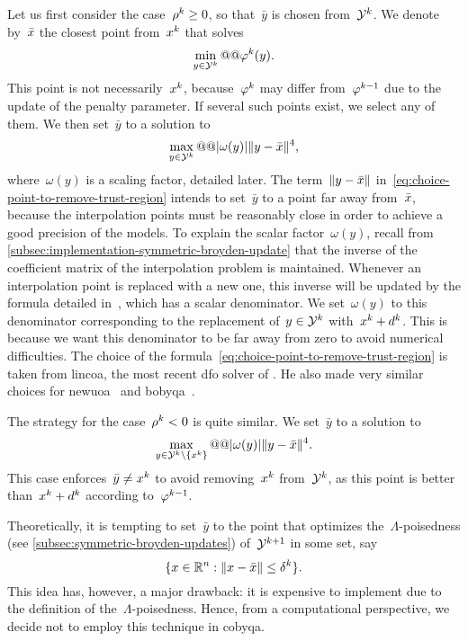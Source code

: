 Let us first consider the case~$\ratio[k] \ge 0$, so that~$\bar{y}$ is chosen from~$\xpt[k]$.
We denote by~$\bar{\iter}$ the closest point from~$\iter[k]$ that solves
\begin{equation*}
    \min_{y \in \xpt[k]} @@ \merit[k](y).
\end{equation*}
This point is not necessarily~$\iter[k]$, because~$\merit[k]$ may differ from~$\merit[k - 1]$ due to the update of the penalty parameter.
If several such points exist, we select any of them.
We then set~$\bar{y}$ to a solution to
\begin{equation}
    \label{eq:choice-point-to-remove-trust-region}
    \max_{y \in \xpt[k]} @@ \abs{\omega(y)} \norm{y - \bar{\iter}}^4,
\end{equation}
where~$\omega(y)$ is a scaling factor, detailed later.
The term~$\norm{y - \bar{\iter}}$ in~\cref{eq:choice-point-to-remove-trust-region} intends to set~$\bar{y}$ to a point far away from~$\bar{\iter}$, because the interpolation points must be reasonably close in order to achieve a good precision of the models.
To explain the scalar factor~$\omega(y)$, recall from \cref{subsec:implementation-symmetric-broyden-update} that the inverse of the coefficient matrix of the interpolation problem is maintained.
Whenever an interpolation point is replaced with a new one, this inverse will be updated by the formula detailed in~\cite[Eq.~(2.12)]{Powell_2004c}, which has a scalar denominator.
We set~$\omega(y)$ to this denominator corresponding to the replacement of~$y \in \xpt[k]$ with~$\iter[k] + \step[k]$.
This is because we want this denominator to be far away from zero to avoid numerical difficulties.
The choice of the formula~\cref{eq:choice-point-to-remove-trust-region} is taken from \gls{lincoa}, the most recent \gls{dfo} solver of \citeauthor{Powell_2015}.
He also made very similar choices for \gls{newuoa}~\cite[Eq.~(7.4)]{Powell_2006} and \gls{bobyqa}~\cite[Eq.~(6.1)]{Powell_2009}.

The strategy for the case~$\ratio[k] < 0$ is quite similar.
We set~$\bar{y}$ to a solution to
\begin{equation*}
    \max_{y \in \xpt[k] \setminus \set{\iter[k]}} @@ \abs{\omega(y)} \norm{y - \bar{\iter}}^4.
\end{equation*}
This case enforces~$\bar{y} \neq \iter[k]$ to avoid removing~$\iter[k]$ from~$\xpt[k]$, as this point is better than~$\iter[k] + \step[k]$ according to~$\merit[k - 1]$.

Theoretically, it is tempting to set~$\bar{y}$ to the point that optimizes the~$\Lambda$-poisedness (see \cref{subsec:symmetric-broyden-updates}) of~$\xpt[k + 1]$ in some set, say
\begin{equation}
    \label{eq:ball-lambda-poisedness}
    \set{x \in \R^n : \norm{x - \bar{\iter}} \le \radlb[k]}.
\end{equation}
This idea has, however, a major drawback: it is expensive to implement due to the definition of the~$\Lambda$-poisedness.
Hence, from a computational perspective, we decide not to employ this technique in \gls{cobyqa}.

